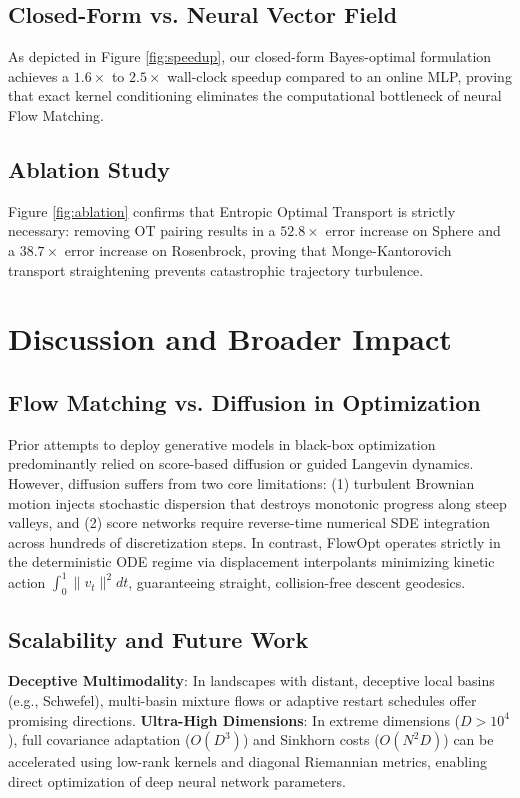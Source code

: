 \documentclass[10pt,journal,compsoc]{IEEEtran}
\begin{document}
\subsection{Closed-Form vs. Neural Vector Field}
As depicted in Figure \ref{fig:speedup}, our closed-form Bayes-optimal formulation achieves a $1.6\times$ to $2.5\times$ wall-clock speedup compared to an online MLP, proving that exact kernel conditioning eliminates the computational bottleneck of neural Flow Matching.

\subsection{Ablation Study}
Figure \ref{fig:ablation} confirms that Entropic Optimal Transport is strictly necessary: removing OT pairing results in a $52.8\times$ error increase on Sphere and a $38.7\times$ error increase on Rosenbrock, proving that Monge-Kantorovich transport straightening prevents catastrophic trajectory turbulence.

\section{Discussion and Broader Impact}

\subsection{Flow Matching vs. Diffusion in Optimization}
Prior attempts to deploy generative models in black-box optimization predominantly relied on score-based diffusion or guided Langevin dynamics. However, diffusion suffers from two core limitations: (1) turbulent Brownian motion injects stochastic dispersion that destroys monotonic progress along steep valleys, and (2) score networks require reverse-time numerical SDE integration across hundreds of discretization steps. In contrast, FlowOpt operates strictly in the deterministic ODE regime via displacement interpolants minimizing kinetic action $\int_0^1 \|v_t\|^2 dt$, guaranteeing straight, collision-free descent geodesics.

\subsection{Scalability and Future Work}
\textbf{Deceptive Multimodality}: In landscapes with distant, deceptive local basins (e.g., Schwefel), multi-basin mixture flows or adaptive restart schedules offer promising directions. \textbf{Ultra-High Dimensions}: In extreme dimensions ($D > 10^4$), full covariance adaptation ($O(D^3)$) and Sinkhorn costs ($O(N^2 D)$) can be accelerated using low-rank kernels and diagonal Riemannian metrics, enabling direct optimization of deep neural network parameters.
\end{document}
